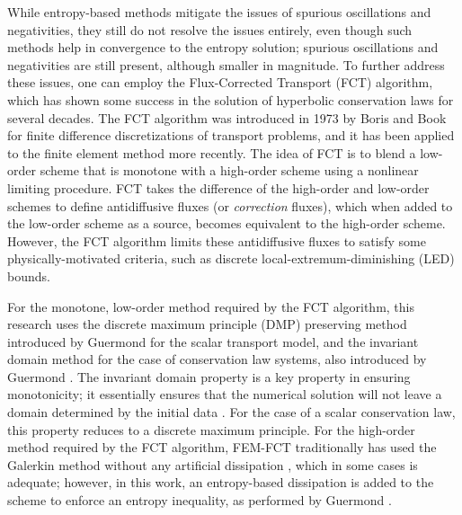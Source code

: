 While entropy-based methods mitigate the issues of spurious oscillations
and negativities, they still do not resolve the issues entirely, even
though such methods help in convergence to the entropy solution; spurious
oscillations and negativities are still present, although smaller in
magnitude. To further address these issues, one can employ the Flux-Corrected Transport (FCT)
algorithm, which has shown some success in the solution of hyperbolic
conservation laws for several decades.
The FCT algorithm was introduced in 1973 by Boris and Book\cite{borisbook} for
finite difference discretizations of transport problems, and it has
been applied to the finite element method more recently. The idea of FCT
is to blend a low-order scheme that is monotone with a high-order
scheme using a nonlinear limiting procedure. FCT takes the difference
of the high-order and low-order schemes to define antidiffusive
fluxes (or \emph{correction} fluxes), which when added to the low-order
scheme as a source, becomes equivalent to the high-order scheme. However,
the FCT algorithm limits these antidiffusive fluxes to satisfy some
physically-motivated criteria, such as discrete local-extremum-diminishing
(LED) bounds.

For the monotone, low-order method required by the FCT algorithm, this research
uses the discrete maximum principle (DMP) preserving method introduced by Guermond
\cite{guermond_firstorder} for the scalar transport model, and the invariant
domain method for the case of conservation law systems,
also introduced by Guermond \cite{guermond_invariantdomain}.
The invariant domain property is a key
property in ensuring monotonicity; it essentially ensures that the numerical
solution will not leave a domain determined by the initial data \cite{hoff_1985}.
For the case of a scalar conservation law, this property reduces to a discrete
maximum principle.
For the high-order method required by the FCT algorithm, FEM-FCT traditionally
has used the Galerkin method without any artificial dissipation \cite{kuzmin_FCT},
which in some cases is adequate; however, in
this work, an entropy-based dissipation is added to the scheme to enforce
an entropy inequality, as performed by Guermond
\cite{guermond_ev}\cite{guermond_secondorder}.


